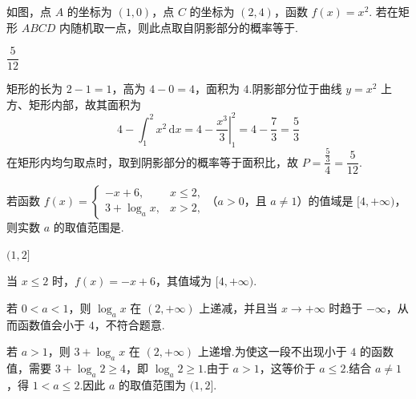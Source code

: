 \begin{problem}
如图，点 \(A\) 的坐标为 \((1,0)\)，点 \(C\) 的坐标为 \((2,4)\)，函数 \(f(x) = x^2\). 若在矩形 \(ABCD\) 内随机取一点，则此点取自阴影部分的概率等于\fillinblank{}.

\end{problem}

\begin{answer}
\(\dfrac{5}{12}\)
\end{answer}

\begin{solution}
矩形的长为 \(2-1=1\)，高为 \(4-0=4\)，面积为 \(4\).阴影部分位于曲线 \(y=x^2\) 上方、矩形内部，故其面积为
\[
4-\int_1^2x^2\,\mathrm{d}x
=4-\left.\frac{x^3}{3}\right|_1^2
=4-\frac73=\frac53
\]
在矩形内均匀取点时，取到阴影部分的概率等于面积比，故
\(P=\dfrac{\frac{5}{3}}{4}=\dfrac5{12}\).
\end{solution}

\begin{problem}
若函数 \(f(x) = \begin{cases}
-x + 6, & x \leqslant 2,\\
3 + \log_a x, & x > 2,
\end{cases}\)（\(a > 0\)，且 \(a \neq 1\)）的值域是 \([4, +\infty)\)，则实数 \(a\) 的取值范围是\fillinblank{}.
\end{problem}

\begin{answer}
\((1,2]\)
\end{answer}

\begin{solution}
当 \(x\leqslant2\) 时，\(f(x)=-x+6\)，其值域为 \([4,+\infty)\).

若 \(0<a<1\)，则 \(\log_a x\) 在 \((2,+\infty)\) 上递减，并且当 \(x\to+\infty\) 时趋于 \(-\infty\)，从而函数值会小于 \(4\)，不符合题意.

若 \(a>1\)，则 \(3+\log_a x\) 在 \((2,+\infty)\) 上递增.为使这一段不出现小于 \(4\) 的函数值，需要
\(3+\log_a2\geqslant4\)，即 \(\log_a2\geqslant1\).由于 \(a>1\)，这等价于 \(a\leqslant2\).结合 \(a\neq1\)，得 \(1<a\leqslant2\).因此 \(a\) 的取值范围为 \((1,2]\).
\end{solution}

